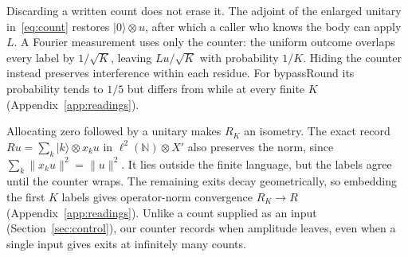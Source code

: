 \documentclass[acmsmall,screen,review,anonymous,nonacm]{acmart}
\newcommand{\N}{\mathbb N}
\newcommand{\storyinlineface}{\small\ttfamily}
\newcommand{\code}[1]{\textnormal{\storyinlineface #1}}
\newcommand{\ket}[1]{\lvert #1\rangle}
\numberwithin{equation}{section}
\begin{document}
Discarding a written count does not erase it. The adjoint of the enlarged unitary in~\eqref{eq:count} restores $\ket0\otimes u$, after which a caller who knows the body can apply $L$. A Fourier measurement uses only the counter: the uniform outcome overlaps every label by $1/\sqrt K$, leaving $Lu/\sqrt K$ with probability $1/K$. Hiding the counter instead preserves interference within each residue. For \code{bypassRound} its probability tends to $1/5$ but differs from \code{while} at every finite $K$ (Appendix~\ref{app:readings}).

Allocating zero followed by a unitary makes $R_K$ an isometry. The exact record $Ru=\sum_k\ket k\otimes x_ku$ in $\ell^2(\N)\otimes X'$ also preserves the norm, since $\sum_k\|x_ku\|^2=\|u\|^2$. It lies outside the finite language, but the labels agree until the counter wraps. The remaining exits decay geometrically, so embedding the first $K$ labels gives operator-norm convergence $R_K\to R$ (Appendix~\ref{app:readings}). Unlike a count supplied as an input (Section~\ref{sec:control}), our counter records when amplitude leaves, even when a single input gives exits at infinitely many counts.
\end{document}
